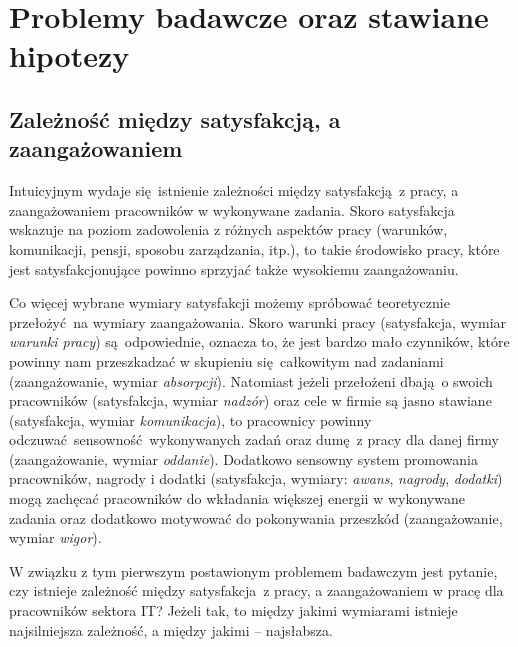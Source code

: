 \section{Problemy badawcze oraz stawiane hipotezy}
\subsection{Zależność między satysfakcją, a zaangażowaniem}
\label{sec:hypothesis-relation}
Intuicyjnym wydaje się istnienie zależności między satysfakcją z pracy, a zaangażowaniem pracowników w wykonywane zadania. Skoro satysfakcja wskazuje na poziom zadowolenia z różnych aspektów pracy (warunków, komunikacji, pensji, sposobu zarządzania, itp.), to takie środowisko pracy, które jest satysfakcjonujące powinno sprzyjać także wysokiemu zaangażowaniu. 

Co więcej wybrane wymiary satysfakcji możemy spróbować teoretycznie przełożyć na wymiary zaangażowania. Skoro warunki pracy (satysfakcja, wymiar \textit{warunki pracy}) są odpowiednie, oznacza to, że jest bardzo mało czynników, które powinny nam przeszkadzać w skupieniu
się całkowitym nad zadaniami (zaangażowanie, wymiar \textit{absorpcji}). Natomiast jeżeli przełożeni dbają o swoich pracowników (satysfakcja, wymiar \textit{nadzór}) oraz cele w firmie są jasno stawiane (satysfakcja, wymiar \textit{komunikacja}), to pracownicy powinny odczuwać sensowność wykonywanych zadań oraz dumę z pracy dla danej firmy (zaangażowanie, wymiar \textit{oddanie}). Dodatkowo sensowny system promowania pracowników, nagrody i dodatki (satysfakcja, wymiary: \textit{awans},
\textit{nagrody}, \textit{dodatki}) mogą zachęcać pracowników do wkładania większej energii w wykonywane zadania oraz dodatkowo motywować do pokonywania przeszkód (zaangażowanie, wymiar \textit{wigor}).

W związku z tym pierwszym postawionym problemem badawczym jest pytanie, czy istnieje zależność między satysfakcja z pracy, a zaangażowaniem w pracę dla pracowników sektora IT? Jeżeli tak, to między jakimi wymiarami istnieje najsilniejsza zależność, a między jakimi -- najsłabsza.

